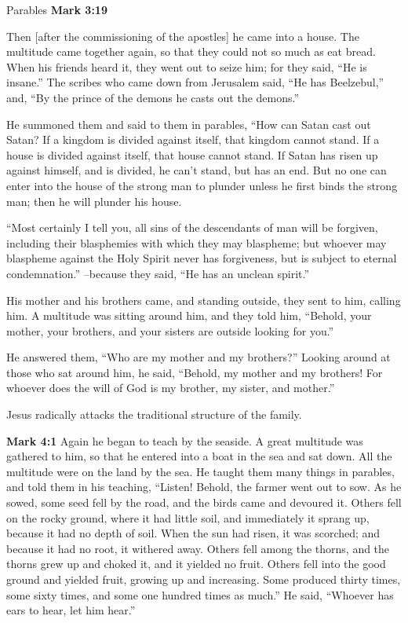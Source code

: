 \documentclass[10pt,twoside]{article} %
\newcommand{\quotesize}{\normalsize{}}
\newcommand{\comm}[1]{\begingroup \color{black!50} #1\endgroup}
\newenvironment{quotetext}{\begingroup\quotesize}{\endgroup}
\newcommand{\bible}[2]{\begin{quotetext}\textbf{#1} #2\end{quotetext}}
\newcommand{\gospelmark}[2]{\bible{Mark #1}{#2}}
\begin{document}
\begin{section}{Parables}
\gospelmark{3:19}{

Then [after the commissioning of the apostles] he came into a house.   The multitude came together again, so that they could not so much as eat bread.   When his friends heard it, they went out to seize him; for they said, ``He is insane.''   The scribes who came down from Jerusalem said, ``He has Beelzebul,'' and, ``By the prince of the demons he casts out the demons.''

  He summoned them and said to them in parables, ``How can Satan cast out Satan?    If a kingdom is divided against itself, that kingdom cannot stand.    If a house is divided against itself, that house cannot stand.    If Satan has risen up against himself, and is divided, he can't stand, but has an end.    But no one can enter into the house of the strong man to plunder unless he first binds the strong man; then he will plunder his house.

   ``Most certainly I tell you, all sins of the descendants of man will be forgiven, including their blasphemies with which they may blaspheme;    but whoever may blaspheme against the Holy Spirit never has forgiveness, but is subject to eternal condemnation.''   --because they said, ``He has an unclean spirit.''

  His mother and his brothers came, and standing outside, they sent to him, calling him.   A multitude was sitting around him, and they told him, ``Behold, your mother, your brothers, and your sisters are outside looking for you.''

  He answered them, ``Who are my mother and my brothers?''   Looking around at those who sat around him, he said, ``Behold, my mother and my brothers!    For whoever does the will of God is my brother, my sister, and mother.''
}

\comm{
Jesus radically attacks the traditional structure of the family.
}

\gospelmark{4:1}{
   Again he began to teach by the seaside. A great multitude was gathered to him, so that he entered into a boat in the sea and sat down. All the multitude were on the land by the sea.   He taught them many things in parables, and told them in his teaching,    ``Listen! Behold, the farmer went out to sow.    As he sowed, some seed fell by the road, and the birds came and devoured it.    Others fell on the rocky ground, where it had little soil, and immediately it sprang up, because it had no depth of soil.    When the sun had risen, it was scorched; and because it had no root, it withered away.    Others fell among the thorns, and the thorns grew up and choked it, and it yielded no fruit.    Others fell into the good ground and yielded fruit, growing up and increasing. Some produced thirty times, some sixty times, and some one hundred times as much.''   He said, ``Whoever has ears to hear, let him hear.''

}
\end{section}
\end{document}
